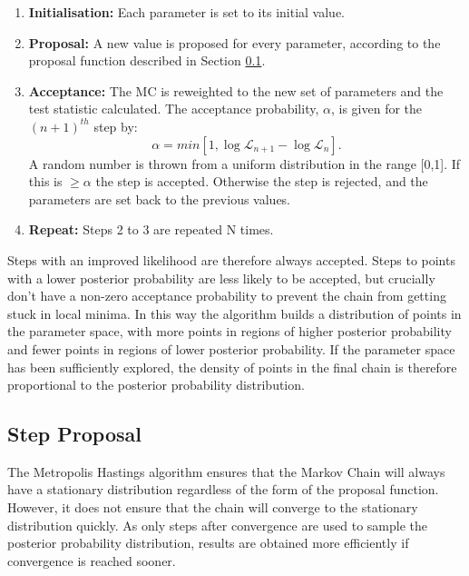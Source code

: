 \begin{enumerate}
\item \textbf{Initialisation:} Each parameter is set to its initial value. \\
\item \textbf{Proposal:} A new value is proposed for every parameter, according to the proposal function described in Section \ref{sec:stepprop}. \\
\item \textbf{Acceptance:} The MC is reweighted to the new set of parameters and the test statistic calculated. The acceptance probability, $\alpha$, is given for the $(n+1)^{th}$ step by:
\begin{equation}
\alpha = min[1, \log\mathcal{L}_{n+1} - \log \mathcal{L}_{n}].
\end{equation}
 A random number is thrown from a uniform distribution in the range [0,1]. If this is $\geq \alpha$ the step is accepted. Otherwise the step is rejected, and the parameters are set back to the previous values.  \\
\item \textbf{Repeat:} Steps 2 to 3 are repeated N times. \\
\end{enumerate}

Steps with an improved likelihood are therefore always accepted. Steps to points with a lower posterior probability are less likely to be accepted, but crucially don't have a non-zero acceptance probability to prevent the chain from getting stuck in local minima. In this way the algorithm builds a distribution of points in the parameter space, with more points in regions of higher posterior probability and fewer points in regions of lower posterior probability. If the parameter space has been sufficiently explored, the density of points in the final chain is therefore proportional to the posterior probability distribution. 

\subsection{Step Proposal}\label{sec:stepprop}

The Metropolis Hastings algorithm ensures that the Markov Chain will always have a stationary distribution regardless of the form of the proposal function. However, it does not ensure that the chain will converge to the stationary distribution quickly. As only steps after convergence are used to sample the posterior probability distribution, results are obtained more efficiently if convergence is reached sooner. 

